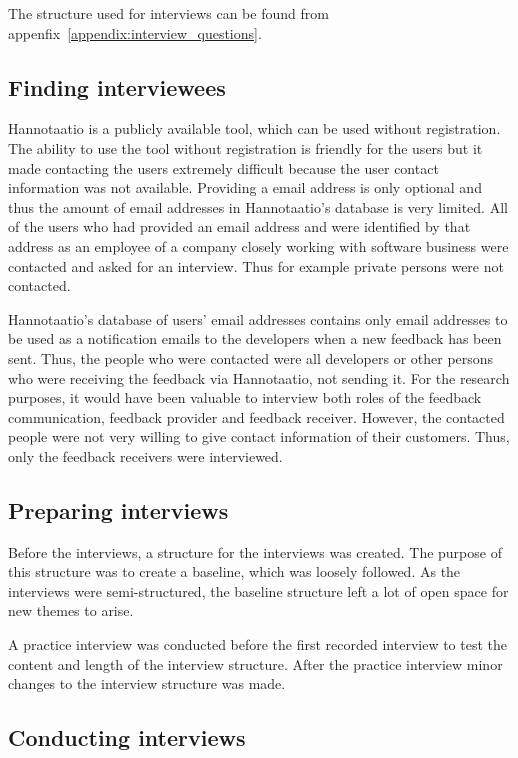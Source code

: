 \documentclass[english,12pt,a4paper,pdftex]{article}
\begin{document}
The structure used for interviews can be found from appenfix~\ref{appendix:interview_questions}.

\subsection{Finding interviewees}

Hannotaatio is a publicly available tool, which can be used without registration. The ability to use the tool without registration is friendly for the users but it made contacting the users extremely difficult because the user contact information was not available. Providing a email address is only optional and thus the amount of email addresses in Hannotaatio's database is very limited. All of the users who had provided an email address and were identified by that address as an employee of a company closely working with software business were contacted and asked for an interview. Thus for example private persons were not contacted.

Hannotaatio's database of users' email addresses contains only email addresses to be used as a notification emails to the developers when a new feedback has been sent. Thus, the people who were contacted were all developers or other persons who were receiving the feedback via Hannotaatio, not sending it. For the research purposes, it would have been valuable to interview both roles of the feedback communication, feedback provider and feedback receiver. However, the contacted people were not very willing to give contact information of their customers. Thus, only the feedback receivers were interviewed.

\subsection{Preparing interviews}

Before the interviews, a structure for the interviews was created. The purpose of this structure was to create a baseline, which was loosely followed. As the interviews were semi-structured, the baseline structure left a lot of open space for new themes to arise.

A practice interview was conducted before the first recorded interview to test the content and length of the interview structure. After the practice interview minor changes to the interview structure was made.

\subsection{Conducting interviews}
\end{document}
